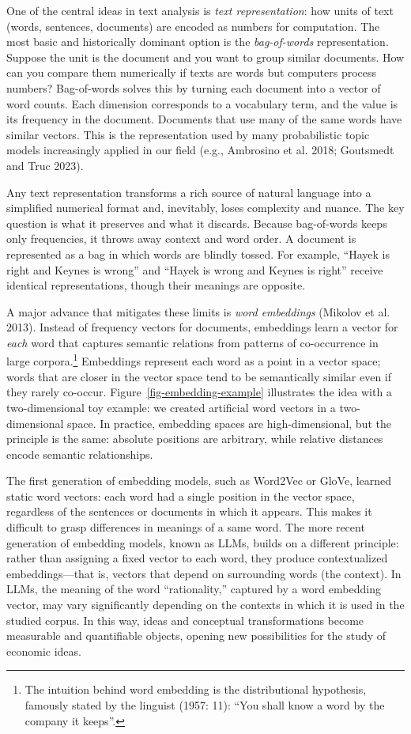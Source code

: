 \documentclass[
]{interact}
\begin{document}
One of the central ideas in text analysis is \emph{text representation}:
how units of text (words, sentences, documents) are encoded as numbers
for computation. The most basic and historically dominant option is the
\emph{bag-of-words} representation. Suppose the unit is the document and
you want to group similar documents. How can you compare them
numerically if texts are words but computers process numbers?
Bag-of-words solves this by turning each document into a vector of word
counts. Each dimension corresponds to a vocabulary term, and the value
is its frequency in the document. Documents that use many of the same
words have similar vectors. This is the representation used by many
probabilistic topic models increasingly applied in our field (e.g.,
Ambrosino et al. 2018; Goutsmedt and Truc 2023).

Any text representation transforms a rich source of natural language
into a simplified numerical format and, inevitably, loses complexity and
nuance. The key question is what it preserves and what it discards.
Because bag-of-words keeps only frequencies, it throws away context and
word order. A document is represented as a bag in which words are
blindly tossed. For example, ``Hayek is right and Keynes is wrong'' and
``Hayek is wrong and Keynes is right'' receive identical
representations, though their meanings are opposite.

A major advance that mitigates these limits is \emph{word embeddings}
(Mikolov et al. 2013). Instead of frequency vectors for documents,
embeddings learn a vector for \emph{each} word that captures semantic
relations from patterns of co-occurrence in large corpora.\footnote{The
  intuition behind word embedding is the distributional hypothesis,
  famously stated by the linguist (1957: 11): ``You shall know a word by
  the company it keeps''.} Embeddings represent each word as a point in
a vector space; words that are closer in the vector space tend to be
semantically similar even if they rarely co-occur.
Figure~\ref{fig-embedding-example} illustrates the idea with a
two-dimensional toy example: we created artificial word vectors in a
two-dimensional space. In practice, embedding spaces are
high-dimensional, but the principle is the same: absolute positions are
arbitrary, while relative distances encode semantic relationships.

The first generation of embedding models, such as Word2Vec or GloVe,
learned static word vectors: each word had a single position in the
vector space, regardless of the sentences or documents in which it
appears. This makes it difficult to grasp differences in meanings of a
same word. The more recent generation of embedding models, known as
LLMs, builds on a different principle: rather than assigning a fixed
vector to each word, they produce contextualized embeddings---that is,
vectors that depend on surrounding words (the context). In LLMs, the
meaning of the word ``rationality,'' captured by a word embedding
vector, may vary significantly depending on the contexts in which it is
used in the studied corpus. In this way, ideas and conceptual
transformations become measurable and quantifiable objects, opening new
possibilities for the study of economic ideas.
\end{document}
